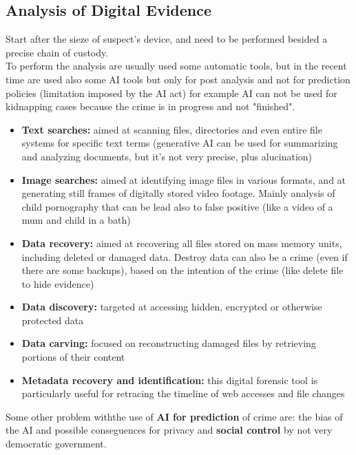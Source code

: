 \subsection{Analysis of Digital Evidence}

Start after the sieze of suspect's device, and need to be performed besided a precise chain of custody. \\ To perform the analysis are usually used some automatic tools, but in the recent time are used also some AI tools but only for post analysis and not for prediction policies (limitation imposed by the AI act) for example AI can not be used for kidnapping cases because the crime is in progress and not "finished".

\begin{itemize}
  \item \textbf{Text searches:} aimed at scanning files, directories and even entire file systems for specific text terms (generative AI can be used for summarizing and analyzing documents, but it's not very precise, plus alucination)

  \item \textbf{Image searches:} aimed at identifying image files in various formats, and at generating still frames of digitally stored video footage. Mainly analysis of child pornography that can be lead also to false positive (like a video of a mum and child in a bath)

  \item \textbf{Data recovery:} aimed at recovering all files stored on mass memory units, including deleted or damaged data. Destroy data can also be a crime (even if there are some backups), based on the intention of the crime (like delete file to hide evidence)

  \item \textbf{Data discovery:} targeted at accessing hidden, encrypted or otherwise protected data

  \item \textbf{Data carving:} focused on reconstructing damaged files by retrieving portions of their content

  \item \textbf{Metadata recovery and identification:} this digital forensic tool is particularly useful for retracing the timeline of web accesses and file changes
\end{itemize}

Some other problem withthe use of \textbf{AI for prediction} of crime are: the bias of the AI and possible conseguences for privacy and \textbf{social control} by not very democratic government.

